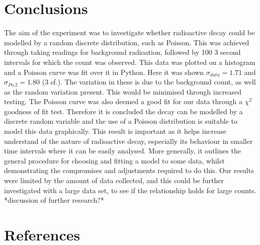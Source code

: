 \documentclass[11pt]{article}
\begin{document}
    \section{Conclusions}
The aim of the experiment was to investigate whether radioactive decay could be modelled by a random discrete distribution, such as Poisson. This was achieved through taking readings for background radioation, followed by 100 3 second intervals for which the count was observed. This data was plotted on a histogram and a Poisson curve was fit over it in Python. Here it was shown $\sigma_{data} = 1.71$ and $\sigma_{Po.2} = 1.80$ (3 sf.). The variation in these is due to the background count, as well as the random variation present. This would be minimised through increased testing. The Poisson curve was also deemed a good fit for our data through a $\chi^{2}$ goodness of fit test. Therefore it is  concluded the decay can be modelled by a discrete random variable and the use of a Poisson distribution is suitable to model this data graphically.
This result is important as it helps increase understand of the nature of radioactive decay, especially its behaviour in smaller time intervals where it can be easily analysed. More generally, it outlines the general procedure for choosing and fitting a model to some data, whilst demonstrating the compromises and adjustments required to do this. Our results were limited by the amount of data collected, and this could be further investigated with a large data set, to see if the relationship holds for large counts. 
*discussion of further research?*
    \section{References}
\end{document}
